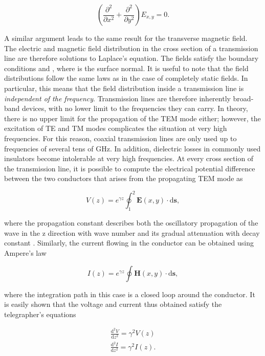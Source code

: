 \begin{equation}
\left(\frac{\partial^2}{\partial x^2}+ \frac{\partial^2}{\partial y^2}\right) E_{x,y} = 0.
\end{equation}

A similar argument leads to the same result for the transverse magnetic
field. The electric and magnetic field distribution in the cross section
of a transmission line are therefore solutions to Laplace's equation.
The fields satisfy the boundary conditions
 and ,
where  is the surface normal. It is useful to note that
the field distributions follow the same laws as in the case of
completely static fields. In particular, this means that the field
distribution inside a transmission line is
\textit{independent of the frequency}. Transmission lines are therefore
inherently broad-band devices, with no lower limit to the frequencies
they can carry. In theory, there is no upper limit for the propagation
of the TEM mode either; however, the excitation of TE and TM modes
complicates the situation at very high frequencies. For this reason,
coaxial transmission lines are only used up to frequencies of several
tens of GHz. In addition, dielectric losses in commonly used insulators
become intolerable at very high frequencies. At every cross section of
the transmission line, it is possible to compute the electrical
potential difference between the two conductors that arises from the
propagating TEM mode as

\begin{equation}
V(z) = e^{\gamma z}\oint_1^2 \mathbf{E}(x,y)\cdot \mathrm{d}\mathbf{s},
\end{equation}

where the propagation constant  describes both
the oscillatory propagation of the wave in the z direction with wave
number  and its gradual attenuation with decay constant \m{\alpha}.
Similarly, the current flowing in the conductor can be obtained using
Ampere's law

\begin{equation}
I(z) = e^{\gamma z} \oint \mathbf{H}(x,y)\cdot \mathrm{d}\mathbf{s},
\end{equation}

where the integration path in this case is a closed loop around the
conductor. It is easily shown that the voltage and current thus obtained
satisfy the telegrapher's equations

\begin{eqnarray}
\frac{\mathrm{d}^2 V}{\mathrm{d}z^2} = \gamma^2 V(z) \\
\frac{\mathrm{d}^2 I}{\mathrm{d}z^2} = \gamma^2 I(z).
\end{eqnarray}

